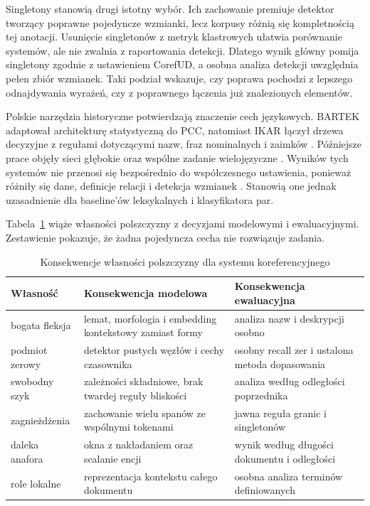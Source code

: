 Singletony stanowią drugi istotny wybór. Ich zachowanie premiuje detektor tworzący poprawne pojedyncze wzmianki, lecz korpusy różnią się kompletnością tej anotacji. Usunięcie singletonów z metryk klastrowych ułatwia porównanie systemów, ale nie zwalnia z raportowania detekcji. Dlatego wynik główny pomija singletony zgodnie z ustawieniem CorefUD, a osobna analiza detekcji uwzględnia pełen zbiór wzmianek. Taki podział wskazuje, czy poprawa pochodzi z lepszego odnajdywania wyrażeń, czy z poprawnego łączenia już znalezionych elementów.

Polskie narzędzia historyczne potwierdzają znaczenie cech językowych. BARTEK adaptował architekturę statystyczną do PCC, natomiast IKAR łączył drzewa decyzyjne z regułami dotyczącymi nazw, fraz nominalnych i zaimków \cite{kopec_2012_bartek,broda_2012_ikar}. Późniejsze prace objęły sieci głębokie oraz wspólne zadanie wielojęzyczne \cite{niton_2018_deep,saputa_2022_polish}. Wyników tych systemów nie przenosi się bezpośrednio do współczesnego ustawienia, ponieważ różniły się dane, definicje relacji i detekcja wzmianek \cite{kaczmarek_2015_evaluation}. Stanowią one jednak uzasadnienie dla baseline’ów leksykalnych i klasyfikatora par.

Tabela~\ref{tab:konsekwencje-polskiego} wiąże własności polszczyzny z decyzjami modelowymi i ewaluacyjnymi. Zestawienie pokazuje, że żadna pojedyncza cecha nie rozwiązuje zadania.

\begin{table}[htbp]
  \centering
  \caption{Konsekwencje własności polszczyzny dla systemu koreferencyjnego}
  \label{tab:konsekwencje-polskiego}
  \begin{tabular}{p{}p{}p{}}
    \toprule
    Własność & Konsekwencja modelowa & Konsekwencja ewaluacyjna \\
    \midrule
    bogata fleksja & lemat, morfologia i embedding kontekstowy zamiast formy & analiza nazw i deskrypcji osobno \\
    podmiot zerowy & detektor pustych węzłów i cechy czasownika & osobny recall zer i ustalona metoda dopasowania \\
    swobodny szyk & zależności składniowe, brak twardej reguły bliskości & analiza według odległości poprzednika \\
    zagnieżdżenia & zachowanie wielu spanów ze wspólnymi tokenami & jawna reguła granic i singletonów \\
    daleka anafora & okna z nakładaniem oraz scalanie encji & wynik według długości dokumentu i odległości \\
    role lokalne & reprezentacja kontekstu całego dokumentu & osobna analiza terminów definiowanych \\
    \bottomrule
  \end{tabular}
\end{table}

